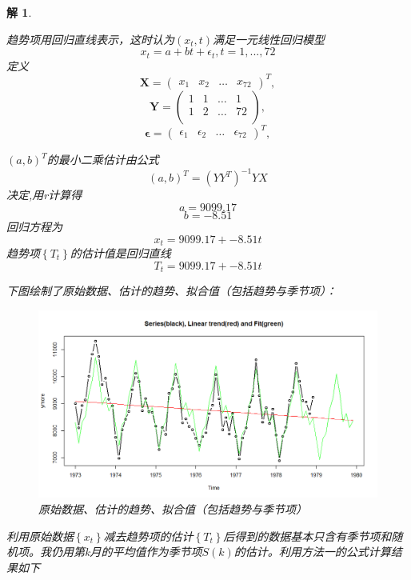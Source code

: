 \documentclass[11pt,a4paper]{ctexart}
\newtheorem*{solution}{解}
\begin{document}
\begin{enumerate}
\begin{solution}
\begin{itemize}
趋势项用回归直线表示，这时认为$(x_t,t)$满足一元线性回归模型
\begin{equation}
x_t=a+bt+\epsilon_t,t=1,...,72
\end{equation}
定义
\[
\mathbf{X} = \left(
\begin{array}{cccc}
	x_{1} & x_{2} & \ldots & x_{72}
\end{array} \right)^T,
\]
\[
\mathbf{Y} = \left(
\begin{array}{cccc}
1 & 1 & \ldots & 1\\
1 & 2 & \ldots & 72\\
\end{array} \right),
\]
\[
\mathbf{\epsilon} = \left(
\begin{array}{cccc}
\epsilon_{1} & \epsilon_{2} & \ldots & \epsilon_{72}
\end{array} \right)^T,
\]

$(a,b)^T$的最小二乘估计由公式$$(a,b)^T=(YY^{T})^{-1}YX$$决定,用r计算得
$$a=9099.17$$$$b=-8.51$$
回归方程为
\begin{equation}
x_t=9099.17+-8.51t
\end{equation}
趋势项$\left\lbrace T_t\right\rbrace $的估计值是回归直线$$T_t=9099.17+-8.51t$$

下图绘制了原始数据、估计的趋势、拟合值（包括趋势与季节项）：
\begin{figure}[H]
	\centering
	\includegraphics[width=12cm]{4.png}  
	\caption{原始数据、估计的趋势、拟合值（包括趋势与季节项）}
\end{figure}
利用原始数据$\left\lbrace x_t\right\rbrace $减去趋势项的估计$\left\lbrace T_t\right\rbrace $后得到的数据基本只含有季节项和随机项。我仍用第k月的平均值作为季节项$S(k)$的估计。利用方法一的公式计算结果如下



\end{itemize}
\end{solution}
\end{enumerate}
\end{document}
